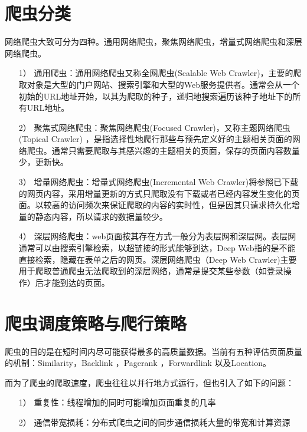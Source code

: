 \documentclass[doctor,privacy,twoside]{buaa_mac}
\begin{document}
\section{爬虫分类}
网络爬虫大致可分为四种。通用网络爬虫，聚焦网络爬虫，增量式网络爬虫和深层网络爬虫。

\begin{itemize}
\item[1）] 通用爬虫：通用网络爬虫又称全网爬虫(Scalable Web Crawler)，主要的爬取对象是大型的门户网站、搜索引擎和大型的Web服务提供者。通常会从一个初始的URL地址开始，以其为爬取的种子，递归地搜索遍历该种子地址下的所有URL地址。
\item[2）] 聚焦式网络爬虫：聚焦网络爬虫(Focused Crawler)，又称主题网络爬虫(Topical Crawler)	，是指选择性地爬行那些与预先定义好的主题相关页面的网络爬虫。通常只需要爬取与其感兴趣的主题相关的页面，保存的页面内容数量少，更新快。
\item[3）] 增量网络爬虫：增量式网络爬虫(Incremental Web Crawler)将参照已下载的网页内容，采用增量更新的方式只爬取没有下载或者已经内容发生变化的页面。以较高的访问频次来保证爬取的内容的实时性，但是因其只请求持久化增量的静态内容，所以请求的数据量较少。
\item[4）] 深层网络爬虫：web页面按其存在方式一般分为表层网和深层网。表层网通常可以由搜索引擎检索，以超链接的形式能够到达，Deep Web指的是不能直接检索，隐藏在表单之后的网页。深层网络爬虫（Deep Web Crawler)主要用于爬取普通爬虫无法爬取到的深层网络，通常是提交某些参数（如登录操作）后才能到达的页面。
\end{itemize}




\section{爬虫调度策略与爬行策略}
爬虫的目的是在短时间内尽可能获得最多的高质量数据。当前有五种评估页面质量的机制：Similarity，Backlink ，Pagerank ，Forwardlink 以及Location。

而为了爬虫的爬取速度，爬虫往往以并行地方式运行，但也引入了如下的问题：

\begin{itemize}
\item[1）] 重复性：线程增加的同时可能增加页面重复的几率
\item[2）] 通信带宽损耗：分布式爬虫之间的同步通信损耗大量的带宽和计算资源
\end{itemize}
\end{document}
